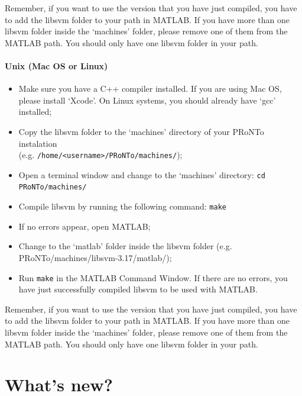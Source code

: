 Remember, if you want to use the version that you have just compiled, you have to add the libsvm folder to your path in MATLAB. If you have more than one libsvm folder inside the `machines' folder, please remove one of them from the MATLAB path. You should only have one libsvm folder in your path.


\paragraph{Unix (Mac OS or Linux)}

\begin{itemize}
    \item Make sure you have a C++ compiler installed. If you are using Mac OS, please install `Xcode'. On Linux systems, you should already have `gcc' installed;
    \item Copy the libsvm folder to the `machines' directory of your PRoNTo instalation\\(e.g. {\tt /home/<username>/PRoNTo/machines/});
    \item Open a terminal window and change to the `machines' directory: {\tt cd PRoNTo/machines/}
    \item Compile libsvm by running the following command: {\tt make}
    \item If no errors appear, open MATLAB;
    \item Change to the `matlab' folder inside the libsvm folder (e.g. PRoNTo/machines/libsvm-3.17/matlab/);
    \item Run {\tt make} in the MATLAB Command Window. If there are no errors, you have just successfully compiled libsvm to be used with MATLAB.
\end{itemize}

Remember, if you want to use the version that you have just compiled, you have to add the libsvm folder to your path in MATLAB. If you have more than one libsvm folder inside the `machines' folder, please remove one of them from the MATLAB path. You should only have one libsvm folder in your path.

\section{What's new?}

